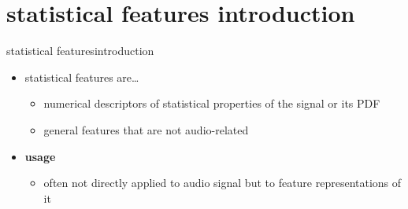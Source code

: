     \section[intro]{statistical features introduction}
        \begin{frame}{statistical features}{introduction}
            \begin{itemize}
                \item   statistical features are\ldots
                    \begin{itemize}
                        \item   numerical descriptors of statistical properties of the signal or its PDF
                        \item   general features that are not audio-related
                    \end{itemize}
                \smallskip
                \item   \textbf{usage}
                    \begin{itemize}
                        \item   often not directly applied to audio signal but to feature representations of it
                    \end{itemize}
            \end{itemize}
            
        \end{frame}
        
